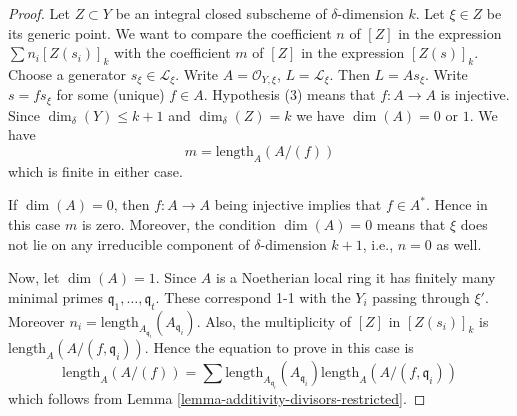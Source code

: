 \documentclass[10pt,a4paper]{amsart}
\theoremstyle{plain}
\theoremstyle{definition}
\theoremstyle{remark}
\numberwithin{equation}{subsection}
\begin{document}
\begin{proof}
Let $Z \subset Y$ be an integral closed subscheme of
$\delta$-dimension $k$. Let $\xi \in Z$ be its generic point.
We want to compare the coefficient $n$ of $[Z]$ in the expression
$\sum n_i[Z(s_i)]_k$ with the coefficient $m$ of $[Z]$ in the
expression $[Z(s)]_k$. Choose a generator $s_\xi \in \mathcal{L}_\xi$.
Write $A = \mathcal{O}_{Y, \xi}$, $L = \mathcal{L}_\xi$.
Then $L = As_\xi$. Write $s = f s_\xi$ for some (unique) $f \in A$.
Hypothesis (3) means that $f : A \to A$ is injective.
Since $\dim_\delta(Y) \leq k + 1$ and $\dim_\delta(Z) = k$
we have $\dim(A) = 0$ or $1$. We have
$$
m = \text{length}_A(A/(f))
$$
which is finite in either case.

\medskip\noindent
If $\dim(A) = 0$, then $f : A \to A$ being injective
implies that $f \in A^*$. Hence in this case $m$ is zero.
Moreover, the condition $\dim(A) = 0$ means that $\xi$
does not lie on any irreducible component of $\delta$-dimension
$k + 1$, i.e., $n = 0$ as well.

\medskip\noindent
Now, let $\dim(A) = 1$.
Since $A$ is a Noetherian local ring it has finitely
many minimal primes $\mathfrak q_1, \ldots, \mathfrak q_t$.
These correspond 1-1 with the $Y_i$ passing through $\xi'$.
Moreover $n_i = \text{length}_{A_{\mathfrak q_i}}(A_{\mathfrak q_i})$.
Also, the multiplicity of $[Z]$ in $[Z(s_i)]_k$ is
$\text{length}_A(A/(f, \mathfrak q_i))$.
Hence the equation to prove in this case is
$$
\text{length}_A(A/(f))
=
\sum \text{length}_{A_{\mathfrak q_i}}(A_{\mathfrak q_i})
\text{length}_A(A/(f, \mathfrak q_i))
$$
which follows from
Lemma \ref{lemma-additivity-divisors-restricted}.
\end{proof}
\end{document}
